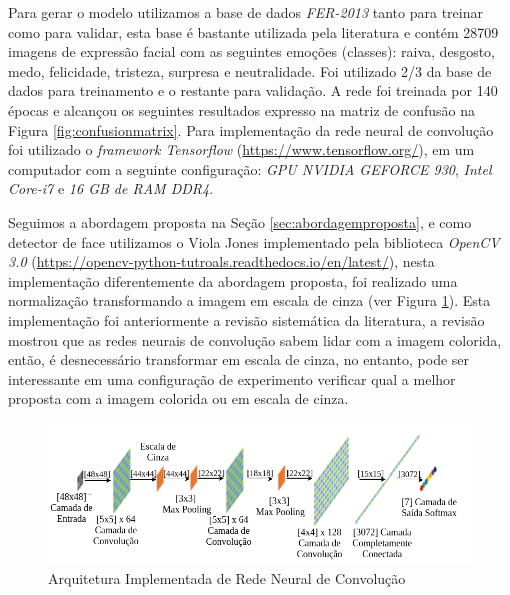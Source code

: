 Para gerar o modelo utilizamos a base de dados \textit{FER-2013} tanto para treinar como para validar, esta base é bastante utilizada pela literatura e contém 28709 imagens de expressão facial com as seguintes emoções (classes): raiva, desgosto, medo, felicidade, tristeza, surpresa e neutralidade. Foi utilizado 2/3 da base de dados para treinamento e o restante para validação. A rede foi treinada por 140 épocas e alcançou os seguintes resultados expresso na matriz de confusão na Figura \ref{fig:confusionmatrix}. Para implementação da rede neural de convolução foi utilizado o \textit{framework Tensorflow} (\url{https://www.tensorflow.org/}), em um computador com a seguinte configuração: \textit{GPU NVIDIA GEFORCE 930}, \textit{Intel Core-i7} e \textit{16 GB de RAM DDR4}. 

Seguimos a abordagem proposta na Seção \ref{sec:abordagemproposta}, e como detector de face utilizamos o Viola Jones implementado pela biblioteca \textit{OpenCV 3.0} (\url{https://opencv-python-tutroals.readthedocs.io/en/latest/}), nesta implementação diferentemente da abordagem proposta, foi realizado uma normalização transformando a imagem em escala de cinza (ver Figura \ref{fig:implementadaarquitetura}). Esta implementação foi anteriormente a revisão sistemática da literatura, a revisão mostrou que as redes neurais de convolução sabem lidar com a imagem colorida, então, é desnecessário transformar em escala de cinza, no entanto, pode ser interessante em uma configuração de experimento verificar qual a melhor proposta com a imagem colorida ou em escala de cinza. 

\begin{figure}
\centering
\includegraphics[scale=0.57]{figuras/arquiteturaimplementada.png}
\caption{Arquitetura Implementada de Rede Neural de Convolução}
\label{fig:implementadaarquitetura}
\end{figure}


